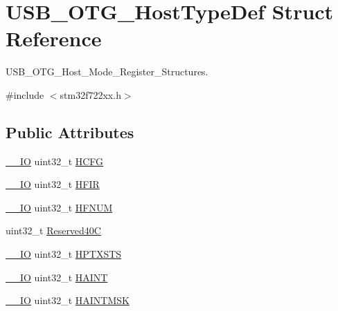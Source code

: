 \hypertarget{struct_u_s_b___o_t_g___host_type_def}{}\section{U\+S\+B\+\_\+\+O\+T\+G\+\_\+\+Host\+Type\+Def Struct Reference}
\label{struct_u_s_b___o_t_g___host_type_def}


U\+S\+B\+\_\+\+O\+T\+G\+\_\+\+Host\+\_\+\+Mode\+\_\+\+Register\+\_\+\+Structures.  




{\ttfamily \#include $<$stm32f722xx.\+h$>$}

\subsection*{Public Attributes}
\begin{DoxyCompactItemize}
\item 
\mbox{\hyperlink{core__sc300_8h_aec43007d9998a0a0e01faede4133d6be}{\+\_\+\+\_\+\+IO}} uint32\+\_\+t \mbox{\hyperlink{struct_u_s_b___o_t_g___host_type_def_ab44a72e139c005445aac54e866f7750f}{H\+C\+FG}}
\item 
\mbox{\hyperlink{core__sc300_8h_aec43007d9998a0a0e01faede4133d6be}{\+\_\+\+\_\+\+IO}} uint32\+\_\+t \mbox{\hyperlink{struct_u_s_b___o_t_g___host_type_def_a509fd299e7540892623954ea4dc1313c}{H\+F\+IR}}
\item 
\mbox{\hyperlink{core__sc300_8h_aec43007d9998a0a0e01faede4133d6be}{\+\_\+\+\_\+\+IO}} uint32\+\_\+t \mbox{\hyperlink{struct_u_s_b___o_t_g___host_type_def_ab4f17f7ef96cf4933e30b1950925c613}{H\+F\+N\+UM}}
\item 
uint32\+\_\+t \mbox{\hyperlink{struct_u_s_b___o_t_g___host_type_def_a0d4a262443e6d12c065adcafabf787ee}{Reserved40C}}
\item 
\mbox{\hyperlink{core__sc300_8h_aec43007d9998a0a0e01faede4133d6be}{\+\_\+\+\_\+\+IO}} uint32\+\_\+t \mbox{\hyperlink{struct_u_s_b___o_t_g___host_type_def_af095d2e3da9e07f63ed7da99276eaaca}{H\+P\+T\+X\+S\+TS}}
\item 
\mbox{\hyperlink{core__sc300_8h_aec43007d9998a0a0e01faede4133d6be}{\+\_\+\+\_\+\+IO}} uint32\+\_\+t \mbox{\hyperlink{struct_u_s_b___o_t_g___host_type_def_af3c15285d6f2efdf4890ea5b27258aca}{H\+A\+I\+NT}}
\item 
\mbox{\hyperlink{core__sc300_8h_aec43007d9998a0a0e01faede4133d6be}{\+\_\+\+\_\+\+IO}} uint32\+\_\+t \mbox{\hyperlink{struct_u_s_b___o_t_g___host_type_def_aa4ec75921a9699f77ee14f377e1b86dc}{H\+A\+I\+N\+T\+M\+SK}}
\end{DoxyCompactItemize}


